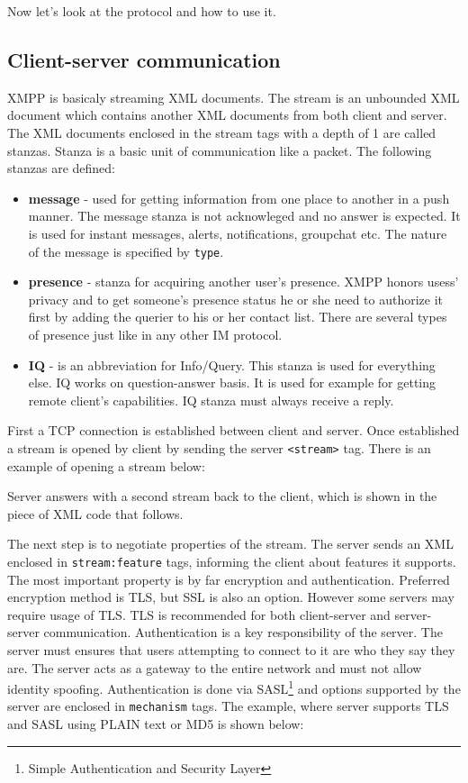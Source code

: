 Now let's look at the protocol and how to use it. 

\subsection*{Client-server communication}
XMPP is basicaly streaming XML documents. The stream is an unbounded XML document which contains another XML documents from both client and server. The XML documents enclosed in the stream tags with a depth of 1 are called stanzas. Stanza is a basic unit of communication like a packet. The following stanzas are defined:

\begin{itemize}
	\item \textbf{message} - used for getting information from one place to another in a push manner. The message stanza is not acknowleged and no answer is expected. It is used for instant messages, alerts, notifications, groupchat etc. The nature of the message is specified by \verb|type|.  
	\item \textbf{presence} - stanza for acquiring another user's presence. XMPP honors usess' privacy and to get someone's presence status he or she need to authorize it first by adding the querier to his or her contact list. There are several types of presence just like in any other IM protocol.     
	\item	\textbf{IQ} - is an abbreviation for Info/Query. This stanza is used for everything else. IQ works on question-answer basis. It is used for example for getting remote client's capabilities. IQ stanza must always receive a reply. 
\end{itemize}

First a TCP connection is established between client and server. Once established a stream is opened by client by sending the server \verb|<stream>| tag. There is an example of opening a stream below: 



Server answers with a second stream back to the client, which is shown in the piece of XML code that follows. 



The next step is to negotiate properties of the stream. The server sends an XML enclosed in \verb|stream:feature| tags, informing the client about features it supports. The most important property is by far encryption and authentication. Preferred encryption method is TLS, but SSL is also an option. However some servers may require usage of TLS. TLS is recommended for both client-server and server-server communication. Authentication is a key responsibility of the server. The server must ensures that users attempting to connect to it are who they say they are. The server acts as a gateway to the entire network and must not allow identity spoofing. Authentication is done via SASL\footnote{Simple Authentication and Security Layer} and options supported by the server are enclosed in \verb|mechanism| tags. The example, where server supports TLS and SASL using PLAIN text or MD5 is shown below:   

